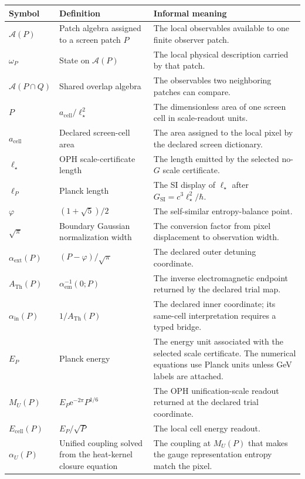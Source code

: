 \documentclass[11pt]{article}
\theoremstyle{remark}
\newcommand{\A}{\mathcal A}
\newcommand{\e}{\mathrm e}
\newcommand{\ATh}{A_{\mathrm{Th}}}
\begin{document}
\begin{longtable}{@{}L{0.20\textwidth}L{0.32\textwidth}L{0.38\textwidth}@{}}
\toprule
Symbol & Definition & Informal meaning \\
\midrule
\endhead
\(\A(P)\) & Patch algebra assigned to a screen patch \(P\) & The local observables available to one finite observer patch. \\
\(\omega_P\) & State on \(\A(P)\) & The local physical description carried by that patch. \\
\(\A(P\cap Q)\) & Shared overlap algebra & The observables two neighboring patches can compare. \\
\(P\) & \(a_{\mathrm{cell}}/\ell_\star^2\) & The dimensionless area of one screen cell in scale-readout units. \\
\(a_{\mathrm{cell}}\) & Declared screen-cell area & The area assigned to the local pixel by the declared screen dictionary. \\
\(\ell_\star\) & OPH scale-certificate length & The length emitted by the selected no-\(G\) scale certificate. \\
\(\ell_P\) & Planck length & The SI display of \(\ell_\star\) after \(G_{\mathrm{SI}}=c^3\ell_\star^2/\hbar\). \\
\(\varphi\) & \((1+\sqrt5)/2\) & The self-similar entropy-balance point. \\
\(\sqrt\pi\) & Boundary Gaussian normalization width & The conversion factor from pixel displacement to observation width. \\
\(\alpha_{\mathrm{ext}}(P)\) & \((P-\varphi)/\sqrt\pi\) & The declared outer detuning coordinate. \\
\(\ATh(P)\) & \(\alpha_{\mathrm{em}}^{-1}(0;P)\) & The inverse electromagnetic endpoint returned by the declared trial map. \\
\(\alpha_{\mathrm{in}}(P)\) & \(1/\ATh(P)\) & The declared inner coordinate; its same-cell interpretation requires a typed bridge. \\
\(E_P\) & Planck energy & The energy unit associated with the selected scale certificate. The numerical equations use Planck units unless GeV labels are attached. \\
\(M_U(P)\) & \(E_P\e^{-2\pi}P^{1/6}\) & The OPH unification-scale readout returned at the declared trial coordinate. \\
\(E_{\mathrm{cell}}(P)\) & \(E_P/\sqrt P\) & The local cell energy readout. \\
\(\alpha_U(P)\) & Unified coupling solved from the heat-kernel closure equation & The coupling at \(M_U(P)\) that makes the gauge representation entropy match the pixel. \\

\end{longtable}
\end{document}
